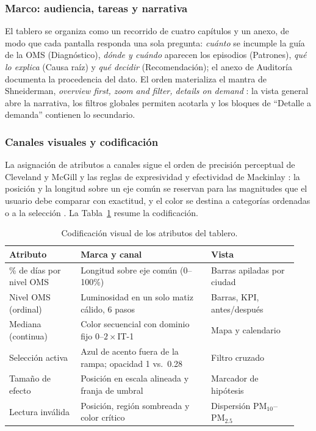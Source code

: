 \documentclass[journal,twocolumn,spanish]{IEEEtran}
\begin{document}
\subsubsection*{Marco: audiencia, tareas y narrativa}
El tablero se organiza como un recorrido de cuatro capítulos y un anexo, de modo que cada pantalla responda una sola pregunta: \emph{cuánto} se incumple la guía de la OMS (Diagnóstico), \emph{dónde y cuándo} aparecen los episodios (Patrones), \emph{qué lo explica} (Causa raíz) y \emph{qué decidir} (Recomendación); el anexo de Auditoría documenta la procedencia del dato. El orden materializa el mantra de Shneiderman, \emph{overview first, zoom and filter, details on demand} \cite{Shneiderman1996}: la vista general abre la narrativa, los filtros globales permiten acotarla y los bloques de ``Detalle a demanda'' contienen lo secundario.

\subsubsection*{Canales visuales y codificación}
La asignación de atributos a canales sigue el orden de precisión perceptual de Cleveland y McGill \cite{Cleveland1984} y las reglas de expresividad y efectividad de Mackinlay \cite{Mackinlay1986}: la posición y la longitud sobre un eje común se reservan para las magnitudes que el usuario debe comparar con exactitud, y el color se destina a categorías ordenadas o a la selección \cite{Munzner2014,Bertin2011}. La Tabla~\ref{tab:canales} resume la codificación.

\begin{table}[htbp]
\caption{Codificación visual de los atributos del tablero.}
\label{tab:canales}
\centering
\footnotesize
\begin{tabular}{@{}p{0.23\linewidth}p{0.42\linewidth}p{0.29\linewidth}@{}}
\toprule
Atributo & Marca y canal & Vista \\
\midrule
\% de días por nivel OMS & Longitud sobre eje común (0--100\%) & Barras apiladas por ciudad \\
Nivel OMS (ordinal) & Luminosidad en un solo matiz cálido, 6 pasos & Barras, KPI, antes/después \\
Mediana (continua) & Color secuencial con dominio fijo $0$--$2\times$IT-1 & Mapa y calendario \\
Selección activa & Azul de acento fuera de la rampa; opacidad 1 vs.\ 0.28 & Filtro cruzado \\
Tamaño de efecto & Posición en escala alineada y franja de umbral & Marcador de hipótesis \\
Lectura inválida & Posición, región sombreada y color crítico & Dispersión PM$_{10}$--PM$_{2.5}$ \\
\bottomrule
\end{tabular}
\end{table}
\end{document}
